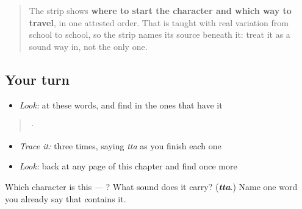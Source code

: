 \begin{quote}
The strip shows \textbf{where to start the character and which way to travel}, in one attested order. That is taught with real variation from school to school, so the strip names its source beneath it: treat it as a sound way in, not the only one.
\end{quote}

\subsection*{Your turn}
\begin{itemize}
\raggedright
  \item \emph{Look:} at these words, and find  in the ones that have it
\end{itemize}

\begin{quote}
  ·  
\end{quote}

\begin{itemize}
\raggedright
  \item \emph{Trace it:}  three times, saying \emph{tta} as you finish each one
  \item \emph{Look:} back at any page of this chapter and find  once more
\end{itemize}

\begin{tcolorbox}[breakable,colback=teal!4,colframe=teal!35!black,title={Before you move on}]
Which character is this — ? What sound does it carry? (\emph{\textbf{tta}}.) Name one word you already say that contains it.
\end{tcolorbox}
